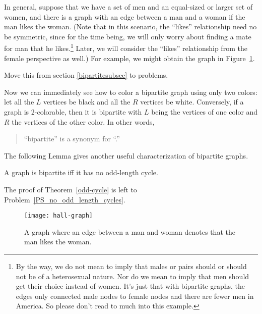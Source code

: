 In general, suppose that we have a set of men and an equal-sized or
larger set of women, and there is a graph with an edge between a man
and a woman if the man likes the woman.  (Note that in this scenario,
the ``likes'' relationship need no be symmetric, since for the time
being, we will only worry about finding a mate for man that he
likes.\footnote{By the way, we do not mean to imply that males or
  pairs should or should not be of a heterosexual nature.  Nor do we
  mean to imply that men should get their choice instead of women.
  It's just that with bipartite graphs, the edges only connected male
  nodes to female nodes and there are fewer men in America.  So please
  don't read to much into this example.}  Later, we will consider the
``likes'' relationship from the female perspective as well.)  For
example, we might obtain the graph in Figure~\ref{fig:5J}.

\begin{problems}

\begin{editingnotes}

Move this from section \ref{bipartitesubsec} to problems.

Now we can immediately see how to color a bipartite graph using only two
colors: let all the $L$ vertices be black and all the $R$ vertices be
white.  Conversely, if a graph is 2-colorable, then it is bipartite with
$L$ being the vertices of one color and $R$ the vertices of the other
color.  In other words,
\begin{quote}
``bipartite'' is a synonym for ``.''
\end{quote}
The following Lemma gives another useful characterization of bipartite
graphs.

\begin{theorem}\label{odd-cycle}
A graph is bipartite iff it has no odd-length cycle.
\end{theorem}
The proof of Theorem~\ref{odd-cycle} is left to
Problem~\ref{PS_no_odd_length_cycles}.
\end{editingnotes}

\end{problems}

\begin{figure}

\texttt{[image: hall-graph]}


\caption{A graph where an edge between a man and woman denotes that
  the man likes the woman.}

\label{fig:5J}

\end{figure}

